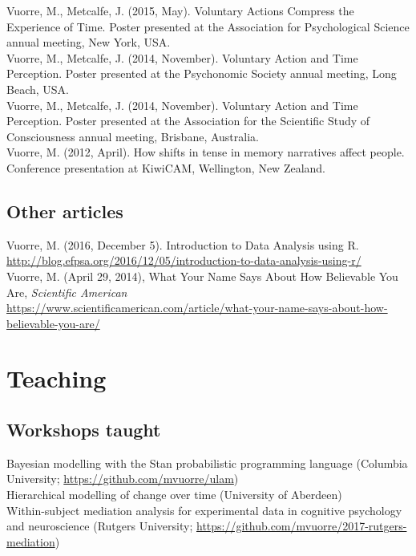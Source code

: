 \documentclass[12pt, letterpaper]{article}
\newcommand{\years}[1]{\marginnote{\scriptsize #1}}
\begin{document}
Vuorre, M., Metcalfe, J. (2015, May). Voluntary Actions Compress the Experience of Time. Poster presented at the Association for Psychological Science annual meeting, New York, USA.\\[.25cm]
\years{2014}
Vuorre, M., Metcalfe, J. (2014, November). Voluntary Action and Time Perception. Poster presented at the Psychonomic Society annual meeting, Long Beach, USA.\\[.15cm]
Vuorre, M., Metcalfe, J. (2014, November). Voluntary Action and Time Perception. Poster presented at the Association for the Scientific Study of Consciousness annual meeting, Brisbane, Australia.\\[.25cm]
\years{2012}
Vuorre, M. (2012, April). How shifts in tense in memory narratives affect people. Conference presentation at KiwiCAM, Wellington, New Zealand.

\subsection*{Other articles}
\noindent
\years{2016}Vuorre, M. (2016, December 5). Introduction to Data Analysis using R.\\ \url{http://blog.efpsa.org/2016/12/05/introduction-to-data-analysis-using-r/}\\[.2cm]
\years{2014}Vuorre, M. (April 29, 2014), What Your Name Says About How Believable You Are, \emph{Scientific American}\\ \url{https://www.scientificamerican.com/article/what-your-name-says-about-how-believable-you-are/}

\section*{Teaching}

\subsection*{Workshops taught}
\years{2019}
Bayesian modelling with the Stan probabilistic programming language (Columbia University; \url{https://github.com/mvuorre/ulam})\\
\years{2018}
Hierarchical modelling of change over time (University of Aberdeen)\\
\years{2017}
Within-subject mediation analysis for experimental data in cognitive psychology and neuroscience (Rutgers University; \url{https://github.com/mvuorre/2017-rutgers-mediation})\\
\end{document}
